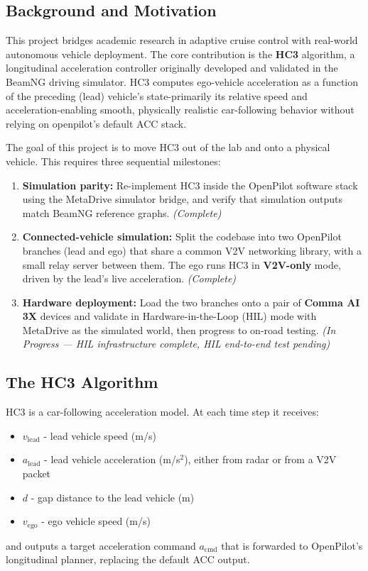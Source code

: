 \documentclass[12pt]{article}
\begin{document}
\subsection{Background and Motivation}

This project bridges academic research in adaptive cruise control with real-world autonomous vehicle deployment. The core contribution is the \textbf{HC3} algorithm, a longitudinal acceleration controller originally developed and validated in the BeamNG driving simulator. HC3 computes ego-vehicle acceleration as a function of the preceding (lead) vehicle's state-primarily its relative speed and acceleration-enabling smooth, physically realistic car-following behavior without relying on openpilot's default ACC stack.

The goal of this project is to move HC3 out of the lab and onto a physical vehicle. This requires three sequential milestones:

\begin{enumerate}[leftmargin=2em]
  \item \textbf{Simulation parity:} Re-implement HC3 inside the OpenPilot software stack using the MetaDrive simulator bridge, and verify that simulation outputs match BeamNG reference graphs. \textit{(Complete)}
  \item \textbf{Connected-vehicle simulation:} Split the codebase into two OpenPilot branches (lead and ego) that share a common V2V networking library, with a small relay server between them. The ego runs HC3 in \textbf{V2V-only} mode, driven by the lead's live acceleration. \textit{(Complete)}
  \item \textbf{Hardware deployment:} Load the two branches onto a pair of \textbf{Comma AI 3X} devices and validate in Hardware-in-the-Loop (HIL) mode with MetaDrive as the simulated world, then progress to on-road testing. \textit{(In Progress --- HIL infrastructure complete, HIL end-to-end test pending)}
\end{enumerate}

\subsection{The HC3 Algorithm}

HC3 is a car-following acceleration model. At each time step it receives:
\begin{itemize}
  \item $v_{\text{lead}}$ - lead vehicle speed (m/s)
  \item $a_{\text{lead}}$ - lead vehicle acceleration (m/s$^2$), either from radar or from a V2V packet
  \item $d$ - gap distance to the lead vehicle (m)
  \item $v_{\text{ego}}$ - ego vehicle speed (m/s)
\end{itemize}
and outputs a target acceleration command $a_{\text{cmd}}$ that is forwarded to OpenPilot's longitudinal planner, replacing the default ACC output.
\end{document}
